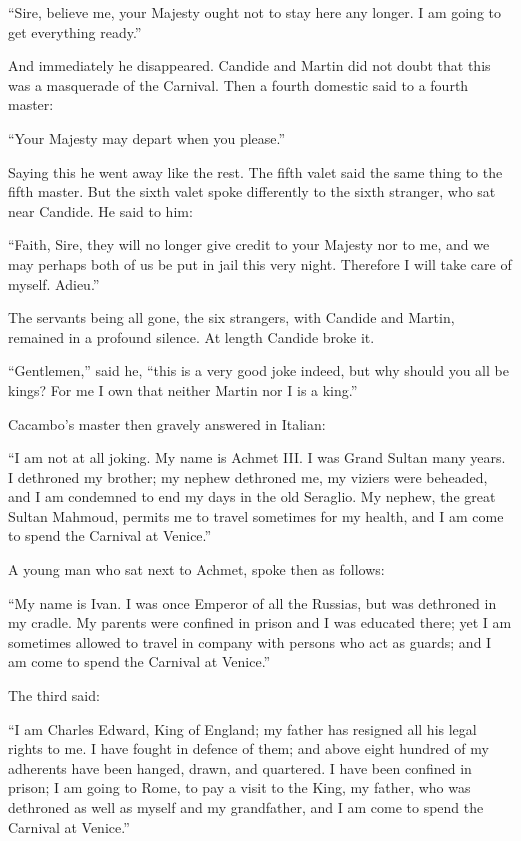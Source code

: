 ``Sire, believe me, your Majesty ought not to stay here any longer. I am going to get everything ready.''

And immediately he disappeared. Candide and Martin did not doubt that this was a masquerade of the Carnival. Then a fourth domestic said to a fourth master:

``Your Majesty may depart when you please.''

Saying this he went away like the rest. The fifth valet said the same thing to the fifth master. But the sixth valet spoke differently to the sixth stranger, who sat near Candide. He said to him:

``Faith, Sire, they will no longer give credit to your Majesty nor to me, and we may perhaps both of us be put in jail this very night. Therefore I will take care of myself. Adieu.''

The servants being all gone, the six strangers, with Candide and Martin, remained in a profound silence. At length Candide broke it.

``Gentlemen,'' said he, ``this is a very good joke indeed, but why should you all be kings? For me I own that neither Martin nor I is a king.''

Cacambo's master then gravely answered in Italian:

``I am not at all joking. My name is Achmet III. I was Grand Sultan many years. I dethroned my brother; my nephew dethroned me, my viziers were beheaded, and I am condemned to end my days in the old Seraglio. My nephew, the great Sultan Mahmoud, permits me to travel sometimes for my health, and I am come to spend the Carnival at Venice.''

A young man who sat next to Achmet, spoke then as follows:

``My name is Ivan. I was once Emperor of all the Russias, but was dethroned in my cradle. My parents were confined in prison and I was educated there; yet I am sometimes allowed to travel in company with persons who act as guards; and I am come to spend the Carnival at Venice.''

The third said:

``I am Charles Edward, King of England; my father has resigned all his legal rights to me. I have fought in defence of them; and above eight hundred of my adherents have been hanged, drawn, and quartered. I have been confined in prison; I am going to Rome, to pay a visit to the King, my father, who was dethroned as well as myself and my grandfather, and I am come to spend the Carnival at Venice.''


